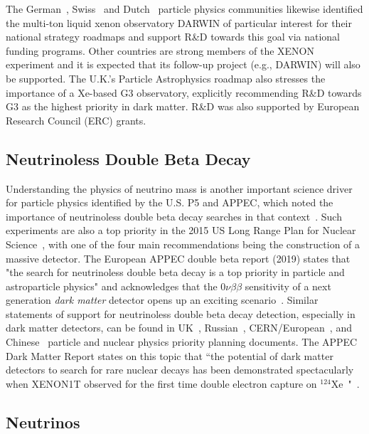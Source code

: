 The German~\cite{GerPS:2018}, Swiss~\cite{chipp2021} and Dutch~\cite{NL:2014} particle physics communities likewise identified the multi-ton liquid xenon observatory DARWIN of particular interest for their national strategy roadmaps and support R\&D towards this goal via national funding programs. Other countries are strong members of the XENON experiment and it is expected that its follow-up project (e.g., DARWIN) will also be supported. The U.K.’s Particle Astrophysics roadmap also stresses the importance of a Xe-based G3 observatory, explicitly recommending R\&D towards G3 as the highest priority in dark matter. R\&D was also supported by European Research Council (ERC) grants.


\subsection{Neutrinoless Double Beta Decay}

Understanding the physics of neutrino mass is another important science driver for particle physics identified by the U.S. P5 and APPEC, which noted the importance of neutrinoless double beta decay searches in that context~\cite{P5:2014,APPEC:2017}. Such experiments are also a top priority in the 2015 US Long Range Plan for Nuclear Science~\cite{LRP:2015}, with one of the four main recommendations being the construction of a massive detector. The European APPEC double beta report (2019) states that "the search for neutrinoless double beta decay is a top priority in particle and astroparticle physics" and acknowledges that the $0\nu\beta\beta$ sensitivity of a next generation \emph{dark matter} detector opens up an exciting scenario~\cite{Giuliani:2019uno}. Similar statements of support for neutrinoless double beta decay detection, especially in dark matter detectors, can be found in UK~\cite{UK:2015}, Russian~\cite{Russia:2012}, CERN/European~\cite{CERN:2013}, and Chinese~\cite{China:2020} particle and nuclear physics priority planning documents. The APPEC Dark Matter Report states on this topic that ``the potential of dark matter detectors to search for rare nuclear decays has been demonstrated spectacularly when XENON1T observed for the first time double electron capture on $^{124}$Xe~\cite{XENON:2019dti}"~\cite{Billard:2021uyg}. 

\subsection{Neutrinos}

